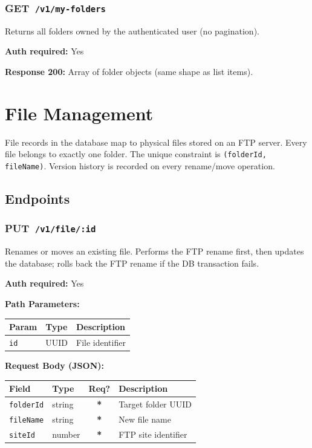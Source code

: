 \documentclass[12pt,a4paper]{article}
\newcommand{\httpget}[1]{%
  \colorbox{getcolor!20}{\textcolor{getcolor}{\textbf{\small GET}}}~\texttt{#1}%
}
\newcommand{\httpput}[1]{%
  \colorbox{putcolor!20}{\textcolor{putcolor}{\textbf{\small PUT}}}~\texttt{#1}%
}
\newcommand{\required}{\textcolor{danger}{\textbf{*}}}
\begin{document}
\vspace{0.5em}
\subsubsection{\httpget{/v1/my-folders}}

Returns all folders owned by the authenticated user (no pagination).

\textbf{Auth required:} Yes

\textbf{Response 200:} Array of folder objects (same shape as list items).

\newpage

\section{File Management}

File records in the database map to physical files stored on an FTP server. Every file belongs to exactly one folder. The unique constraint is \texttt{(folderId, fileName)}. Version history is recorded on every rename/move operation.

\subsection{Endpoints}

\subsubsection{\httpput{/v1/file/:id}}

Renames or moves an existing file. Performs the FTP rename first, then updates the database; rolls back the FTP rename if the DB transaction fails.

\textbf{Auth required:} Yes

\textbf{Path Parameters:}

\begin{tabularx}{\linewidth}{llX}
\toprule
\textbf{Param} & \textbf{Type} & \textbf{Description} \\
\midrule
\texttt{id} & UUID & File identifier \\
\bottomrule
\end{tabularx}

\textbf{Request Body (JSON):}

\begin{tabularx}{\linewidth}{llcX}
\toprule
\textbf{Field} & \textbf{Type} & \textbf{Req?} & \textbf{Description} \\
\midrule
\texttt{folderId}  & string & \required & Target folder UUID \\
\texttt{fileName}  & string & \required & New file name \\
\texttt{siteId}    & number & \required & FTP site identifier \\
\bottomrule
\end{tabularx}
\end{document}
